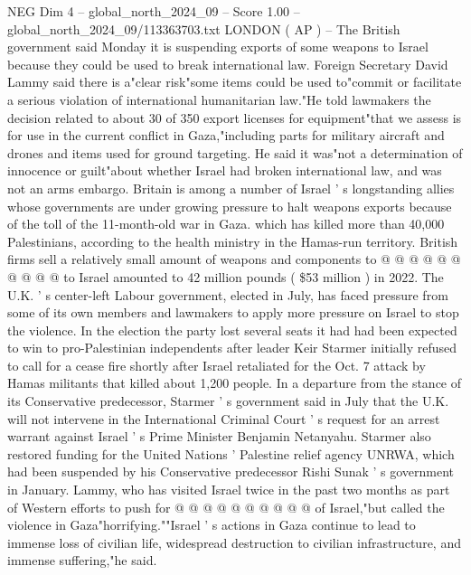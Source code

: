 \begin{textsample}{NEG Dim 4 – global\_north\_2024\_09 – Score 1.00 – global\_north\_2024\_09/113363703.txt}  \label{ex:f4_neg_143}
LONDON ( AP ) -- The British government said Monday it is suspending exports of some weapons to Israel because they could be used to break international law.
Foreign Secretary David Lammy said there is a"clear risk"some items could be used to"commit or facilitate a serious violation of international humanitarian law."He told lawmakers the decision related to about 30 of 350 export licenses for equipment"that we assess is for use in the current conflict in Gaza,"including parts for military aircraft and drones and items used for ground targeting.
He said it was"not a determination of innocence or guilt"about whether Israel had broken international law, and was not an arms embargo.
Britain is among a number of Israel ' s longstanding allies whose governments are under growing pressure to halt weapons exports because of the toll of the 11-month-old war in Gaza. which has killed more than 40,000 Palestinians, according to the health ministry in the Hamas-run territory.
British firms sell a relatively small amount of weapons and components to @ @ @ @ @ @ @ @ @ @ to Israel amounted to 42 million pounds ( \$53 million ) in 2022.
The U.K. ' s center-left Labour government, elected in July, has faced pressure from some of its own members and lawmakers to apply more pressure on Israel to stop the violence.
In the election the party lost several seats it had had been expected to win to pro-Palestinian independents after leader Keir Starmer initially refused to call for a cease fire shortly after Israel retaliated for the Oct. 7 attack by Hamas militants that killed about 1,200 people.
In a departure from the stance of its Conservative predecessor, Starmer ' s government said in July that the U.K. will not intervene in the International Criminal Court ' s request for an arrest warrant against Israel ' s Prime Minister Benjamin Netanyahu.
Starmer also restored funding for the United Nations ' Palestine relief agency UNRWA, which had been suspended by his Conservative predecessor Rishi Sunak ' s government in January.
Lammy, who has visited Israel twice in the past two months as part of Western efforts to push for @ @ @ @ @ @ @ @ @ @ of Israel,"but called the violence in Gaza"horrifying.""Israel ' s actions in Gaza continue to lead to immense loss of civilian life, widespread destruction to civilian infrastructure, and immense suffering,"he said.

\end{textsample}
